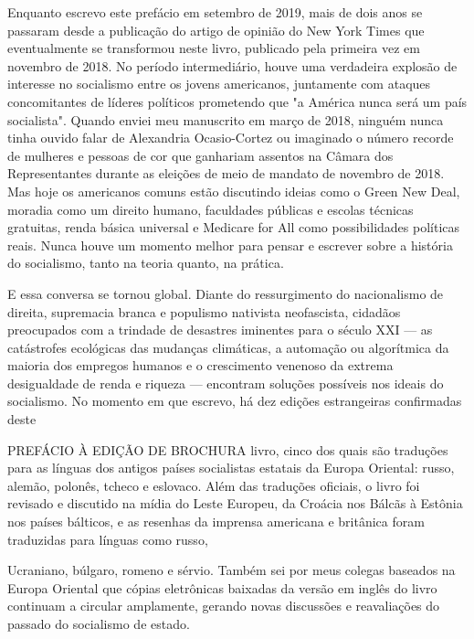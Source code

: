  \par 
Enquanto escrevo este prefácio em setembro de 2019, mais de dois anos se passaram desde a publicação do artigo de opinião do New York Times que eventualmente se transformou neste livro, publicado pela primeira vez em novembro de 2018. No período intermediário, houve uma verdadeira explosão de interesse no socialismo entre os jovens americanos, juntamente com ataques concomitantes de líderes políticos prometendo que "a América nunca será um país socialista". Quando enviei meu manuscrito em março de 2018, ninguém nunca tinha ouvido falar de Alexandria Ocasio-Cortez ou imaginado o número recorde de mulheres e pessoas de cor que ganhariam assentos na Câmara dos Representantes durante as eleições de meio de mandato de novembro de 2018. Mas hoje os americanos comuns estão discutindo ideias como o Green New Deal, moradia como um direito humano, faculdades públicas e escolas técnicas gratuitas, renda básica universal e Medicare for All como possibilidades políticas reais. Nunca houve um momento melhor para pensar e escrever sobre a história do socialismo, tanto na teoria quanto, na prática.
 \par 
E essa conversa se tornou global. Diante do ressurgimento do nacionalismo de direita, supremacia branca e populismo nativista neofascista, cidadãos preocupados com a trindade de desastres iminentes para o século XXI — as catástrofes ecológicas das mudanças climáticas, a automação ou algorítmica da maioria dos empregos humanos e o crescimento venenoso da extrema desigualdade de renda e riqueza — encontram soluções possíveis nos ideais do socialismo. No momento em que escrevo, há dez edições estrangeiras confirmadas deste
 \par 
PREFÁCIO À EDIÇÃO DE BROCHURA livro, cinco dos quais são traduções para as línguas dos antigos países socialistas estatais da Europa Oriental: russo, alemão, polonês, tcheco e eslovaco. Além das traduções oficiais, o livro foi revisado e discutido na mídia do Leste Europeu, da Croácia nos Bálcãs à Estônia nos países bálticos, e as resenhas da imprensa americana e britânica foram traduzidas para línguas como russo,
 \par 
Ucraniano, búlgaro, romeno e sérvio. Também sei por meus colegas baseados na Europa Oriental que cópias eletrônicas baixadas da versão em inglês do livro continuam a circular amplamente, gerando novas discussões e reavaliações do passado do socialismo de estado.
 \par 
